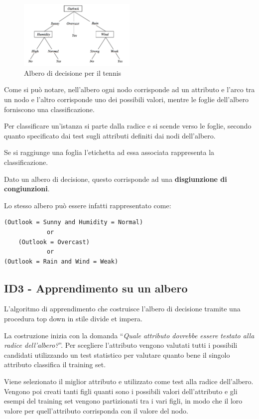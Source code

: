 \begin{figure}[htbp]
\centering
\includegraphics[width=0.5\textwidth]{./notes/immagini/l7-albero.png}
\caption{Albero di decisione per il tennis}
\end{figure}
\FloatBarrier

Come si può notare, nell'albero ogni nodo corrisponde ad un attributo e
l'arco tra un nodo e l'altro corrisponde uno dei possibili valori,
mentre le foglie dell'albero forniscono una classificazione.

Per classificare un'istanza si parte dalla radice e si scende verso le
foglie, secondo quanto specificato dai test sugli attributi definiti dai
nodi dell'albero.

Se si raggiunge una foglia l'etichetta ad essa associata rappresenta la
classificazione.

Dato un albero di decisione, questo corrisponde ad una
\textbf{disgiunzione di congiunzioni}.

Lo stesso albero può essere infatti rappresentato come:

\begin{verbatim}
(Outlook = Sunny and Humidity = Normal) 
            or 
    (Outlook = Overcast)
            or
(Outlook = Rain and Wind = Weak) 
\end{verbatim}

\subsection{ID3 - Apprendimento su un albero}\label{id3---apprendimento-su-un-albero}

L'algoritmo di apprendimento che costruisce l'albero di decisione
tramite una procedura top down in stile divide et impera.

La costruzione inizia con la domanda ``\emph{Quale
attributo dovrebbe essere testato alla radice dell'albero?}''. Per
scegliere l'attributo vengono valutati tutti i possibili candidati
utilizzando un test statistico per valutare quanto bene il singolo
attributo classifica il training set.

Viene selezionato il miglior attributo e utilizzato come test alla
radice dell'albero. Vengono poi creati tanti figli quanti sono i
possibili valori dell'attributo e gli esempi del training set vengono
partizionati tra i vari figli, in modo che il loro valore per
quell'attributo corrisponda con il valore del nodo.

